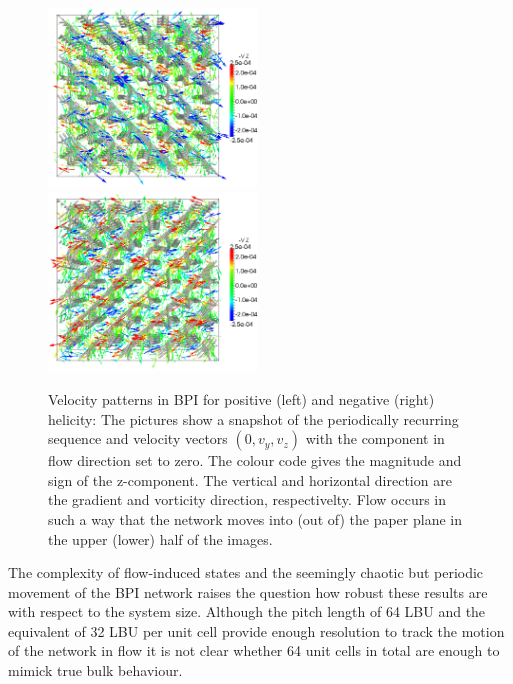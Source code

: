 \documentclass[aps,pre,reprint,superscriptaddress, twocolumn]{revtex4}
\begin{document}
\begin{figure}[htpb]
\includegraphics[width=0.495\textwidth]{v_yz-v_z-360k_run914.png}
\includegraphics[width=0.495\textwidth]{v_yz-v_z-360k_run922.png}
\caption{Velocity patterns in BPI for positive (left) and negative (right) helicity: The pictures show a snapshot of the periodically recurring sequence and velocity vectors $(0,v_y,v_z)$ with the component in flow direction set to zero. The colour code gives the magnitude and sign of the z-component. The vertical and horizontal direction are the gradient and vorticity direction, respectivelty. Flow occurs in such a way that the network moves into (out of) the paper plane in the upper (lower) half of the images.}
\label{bp1-velo}
\end{figure}

The complexity of flow-induced states and the seemingly chaotic but 
periodic movement of the BPI network raises the question how robust 
these results are with respect to the system size.
Although the pitch length of 64 LBU and the equivalent of 32 LBU per
unit cell provide enough resolution to track the motion of the 
network in flow it is not clear whether 64 unit cells in total are enough to 
mimick true bulk behaviour. 
\end{document}

